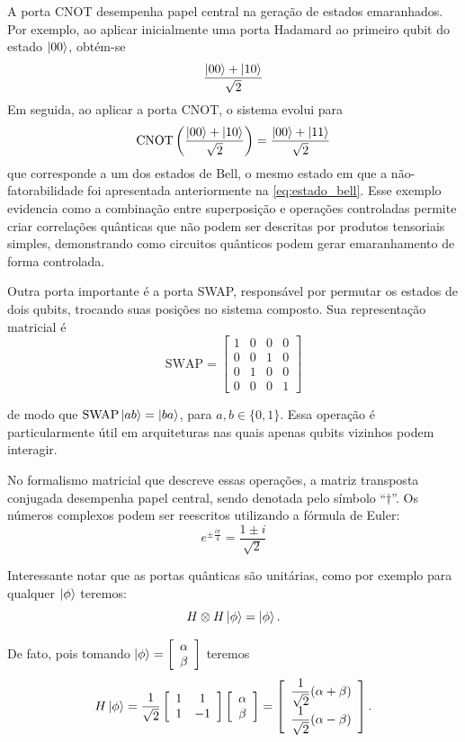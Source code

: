 {\red A porta CNOT desempenha papel central na geração de estados emaranhados. Por exemplo, ao aplicar inicialmente uma porta Hadamard ao primeiro qubit do estado $\ket{00}$, obtém-se
$$
\frac{\ket{00}+\ket{10}}{\sqrt{2}}
$$
Em seguida, ao aplicar a porta CNOT, o sistema evolui para
$$
\mathrm{CNOT}\left(\frac{\ket{00}+\ket{10}}{\sqrt{2}}\right)
=
\frac{\ket{00}+\ket{11}}{\sqrt{2}}
$$
que corresponde a um dos estados de Bell, o mesmo estado em que a  não-fatorabilidade foi apresentada anteriormente na \autoref{eq:estado_bell}. Esse exemplo evidencia como a combinação entre superposição e operações controladas permite criar correlações quânticas que não podem ser descritas por produtos tensoriais simples, demonstrando como circuitos quânticos podem gerar emaranhamento de forma controlada.}


Outra porta importante é a porta SWAP, responsável por permutar os estados de dois qubits, trocando suas posições no sistema composto. Sua representação matricial é
$$
    \mathrm{SWAP}= \left[
    \begin{array}{cccc}
        1 & 0 & 0 & 0\\
        0 & 0 & 1 & 0\\
        0 & 1 & 0 & 0\\
        0 & 0 & 0 & 1
    \end{array} \right]
$$

\noindent de modo que $\mathrm{SWAP}\ket{ab}=\ket{ba}$, para $a,b\in\{0,1\}$. Essa operação é particularmente útil em arquiteturas nas quais apenas qubits vizinhos podem interagir.

No formalismo matricial que descreve essas operações, a matriz transposta conjugada desempenha papel central, sendo denotada pelo símbolo ``$\dagger$''. Os números complexos podem ser reescritos utilizando a fórmula de Euler:
    $$
        e^{\pm\frac{i\pi}{4}} = \dfrac{1\pm i}{\sqrt{2}}
    $$
    
Interessante notar que as portas quânticas são {\red unitárias}, como por exemplo para qualquer $\ket{\phi}$ teremos:
    $$
        H\otimes H\ket{\phi} = \ket{\phi}.
    $$
    
De fato, pois tomando $\ket{\phi}=\left[\begin{array}{c}
         \alpha \\
         \beta
    \end{array}\right]$ teremos
    $$
        H\ket{\phi}= \dfrac{1}{\sqrt{2}} \left[\begin{array}{cc}
             1 & 1 \\
             1 & -1
        \end{array}\right]\left[\begin{array}{c}
             \alpha \\
             \beta
        \end{array}\right] = \left[\begin{array}{c}
             \dfrac{1}{\sqrt{2}}(\alpha+\beta) \\
             \dfrac{1}{\sqrt{2}}(\alpha - \beta)
        \end{array}\right].
    $$
    
